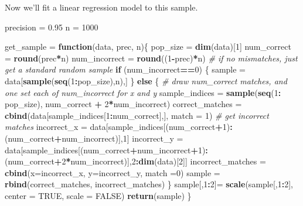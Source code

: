 \documentclass[
]{article}
\newenvironment{Shaded}{\begin{snugshade}}{\end{snugshade}}
\newcommand{\CommentTok}[1]{\textcolor[rgb]{0.56,0.35,0.01}{\textit{#1}}}
\newcommand{\ControlFlowTok}[1]{\textcolor[rgb]{0.13,0.29,0.53}{\textbf{#1}}}
\newcommand{\DataTypeTok}[1]{\textcolor[rgb]{0.13,0.29,0.53}{#1}}
\newcommand{\DecValTok}[1]{\textcolor[rgb]{0.00,0.00,0.81}{#1}}
\newcommand{\FloatTok}[1]{\textcolor[rgb]{0.00,0.00,0.81}{#1}}
\newcommand{\KeywordTok}[1]{\textcolor[rgb]{0.13,0.29,0.53}{\textbf{#1}}}
\newcommand{\NormalTok}[1]{#1}
\newcommand{\OperatorTok}[1]{\textcolor[rgb]{0.81,0.36,0.00}{\textbf{#1}}}
\newcommand{\OtherTok}[1]{\textcolor[rgb]{0.56,0.35,0.01}{#1}}
\newcommand{\StringTok}[1]{\textcolor[rgb]{0.31,0.60,0.02}{#1}}
\begin{document}
Now we'll fit a linear regression model to this sample.

\begin{Shaded}
\begin{Highlighting}[]
\NormalTok{precision =}\StringTok{ }\FloatTok{0.95}
\NormalTok{n =}\StringTok{ }\DecValTok{1000}

\NormalTok{get_sample =}\StringTok{ }\ControlFlowTok{function}\NormalTok{(data, prec, n)\{}
\NormalTok{  pop_size =}\StringTok{ }\KeywordTok{dim}\NormalTok{(data)[}\DecValTok{1}\NormalTok{]}
\NormalTok{  num_correct =}\StringTok{ }\KeywordTok{round}\NormalTok{(prec}\OperatorTok{*}\NormalTok{n)}
\NormalTok{  num_incorrect =}\StringTok{ }\KeywordTok{round}\NormalTok{((}\DecValTok{1}\OperatorTok{-}\NormalTok{prec)}\OperatorTok{*}\NormalTok{n)}
  \CommentTok{# if no mismatches, just get a standard random sample}
  \ControlFlowTok{if}\NormalTok{ (num_incorrect}\OperatorTok{==}\DecValTok{0}\NormalTok{) \{ }
\NormalTok{    sample =}\StringTok{ }\NormalTok{data[}\KeywordTok{sample}\NormalTok{(}\KeywordTok{seq}\NormalTok{(}\DecValTok{1}\OperatorTok{:}\NormalTok{pop_size),n),]}
\NormalTok{  \} }\ControlFlowTok{else}\NormalTok{ \{}
    \CommentTok{# draw num_correct matches, and one set each of num_incorrect for x and y}
\NormalTok{    sample_indices =}\StringTok{ }\KeywordTok{sample}\NormalTok{(}\KeywordTok{seq}\NormalTok{(}\DecValTok{1}\OperatorTok{:}\StringTok{ }\NormalTok{pop_size), num_correct }\OperatorTok{+}\StringTok{ }\DecValTok{2}\OperatorTok{*}\NormalTok{num_incorrect)}
\NormalTok{    correct_matches =}\StringTok{ }\KeywordTok{cbind}\NormalTok{(data[sample_indices[}\DecValTok{1}\OperatorTok{:}\NormalTok{num_correct],], }\DataTypeTok{match =} \DecValTok{1}\NormalTok{)}
    \CommentTok{# get incorrect matches}
\NormalTok{    incorrect_x =}\StringTok{ }\NormalTok{data[sample_indices[(num_correct}\OperatorTok{+}\DecValTok{1}\NormalTok{)}\OperatorTok{:}\NormalTok{(num_correct}\OperatorTok{+}\NormalTok{num_incorrect)],}\DecValTok{1}\NormalTok{]}
\NormalTok{    incorrect_y =}\StringTok{ }\NormalTok{data[sample_indices[(num_correct}\OperatorTok{+}\NormalTok{num_incorrect}\OperatorTok{+}\DecValTok{1}\NormalTok{)}\OperatorTok{:}\NormalTok{(num_correct}\OperatorTok{+}\DecValTok{2}\OperatorTok{*}\NormalTok{num_incorrect)],}\DecValTok{2}\OperatorTok{:}\KeywordTok{dim}\NormalTok{(data)[}\DecValTok{2}\NormalTok{]]}
\NormalTok{    incorrect_matches =}\StringTok{ }\KeywordTok{cbind}\NormalTok{(}\DataTypeTok{x=}\NormalTok{incorrect_x, }\DataTypeTok{y=}\NormalTok{incorrect_y, }\DataTypeTok{match =}\DecValTok{0}\NormalTok{)}
\NormalTok{    sample =}\StringTok{ }\KeywordTok{rbind}\NormalTok{(correct_matches, incorrect_matches)}
\NormalTok{  \}}
\NormalTok{  sample[,}\DecValTok{1}\OperatorTok{:}\DecValTok{2}\NormalTok{]=}\StringTok{ }\KeywordTok{scale}\NormalTok{(sample[,}\DecValTok{1}\OperatorTok{:}\DecValTok{2}\NormalTok{], }\DataTypeTok{center =} \OtherTok{TRUE}\NormalTok{, }\DataTypeTok{scale =} \OtherTok{FALSE}\NormalTok{)}
  \KeywordTok{return}\NormalTok{(sample)}
\NormalTok{\}}


\end{Highlighting}
\end{Shaded}
\end{document}
